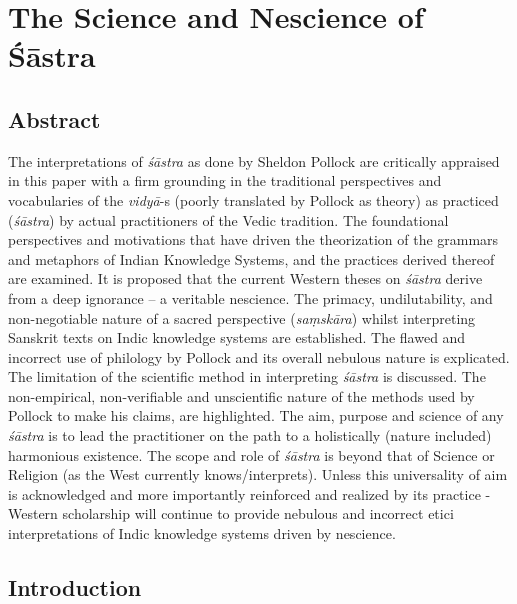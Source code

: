 \chapter{The Science and Nescience of Śāstra}\label{chapter11}
\vskip -10pt

\vskip -10pt

\section*{Abstract}

The interpretations of {\sl śāstra} as done by Sheldon Pollock are critically appraised in this paper with a firm grounding in the traditional perspectives and vocabularies of the {\sl vidyā}-s (poorly translated by Pollock as theory) as practiced ({\sl śāstra}) by actual practitioners of the Vedic tradition. The foundational perspectives and motivations that have driven the theorization of the grammars and metaphors of Indian Knowledge Systems, and the practices derived thereof are examined. It is proposed that the current Western theses on {\sl śāstra} derive from a deep ignorance -- a veritable nescience. The primacy, undilutability, and non-negotiable nature of a sacred perspective ({\sl saṃskāra}) whilst interpreting Sanskrit texts on Indic knowledge systems are established. The flawed and incorrect use of philology by Pollock and its overall nebulous nature is explicated. The limitation of the scientific method in interpreting {\sl śāstra} is discussed. The non-empirical, non-verifiable and unscientific nature of the methods used by Pollock to make his claims, are highlighted. The aim, purpose and science of any {\sl śāstra} is to lead the practitioner on the path to a holistically (nature included) harmonious existence. The scope and role of {\sl śāstra} is beyond that of Science or Religion (as the West currently knows/interprets). Unless this universality of aim is acknowledged and more importantly reinforced and realized by its practice - Western scholarship will continue to provide nebulous and incorrect etici interpretations of Indic knowledge systems driven by nescience.

\section*{Introduction}

